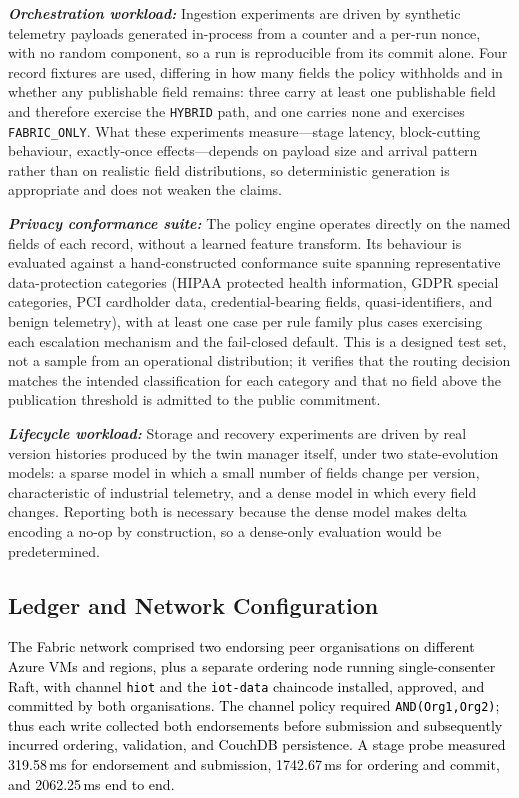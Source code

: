 \documentclass[final,5p,times,twocolumn]{elsarticle}
\begin{document}
\emph{\textbf{Orchestration workload:}} Ingestion experiments are driven by synthetic telemetry payloads generated in-process from a counter and a per-run nonce, with no random component, so a run is reproducible from its commit alone. Four record fixtures are used, differing in how many fields the policy withholds and in whether any publishable field remains: three carry at least one publishable field and therefore exercise the \texttt{HYBRID} path, and one carries none and exercises \texttt{FABRIC\_ONLY}. What these experiments measure---stage latency, block-cutting behaviour, exactly-once effects---depends on payload size and arrival pattern rather than on realistic field distributions, so deterministic generation is appropriate and does not weaken the claims.

\emph{\textbf{Privacy conformance suite:}} The policy engine operates directly on the named fields of each record, without a learned feature transform. Its behaviour is evaluated against a hand-constructed conformance suite spanning representative data-protection categories (HIPAA protected health information, GDPR special categories, PCI cardholder data, credential-bearing fields, quasi-identifiers, and benign telemetry), with at least one case per rule family plus cases exercising each escalation mechanism and the fail-closed default. This is a designed test set, not a sample from an operational distribution; it verifies that the routing decision matches the intended classification for each category and that no field above the publication threshold is admitted to the public commitment.

\emph{\textbf{Lifecycle workload:}} Storage and recovery experiments are driven by real version histories produced by the twin manager itself, under two state-evolution models: a sparse model in which a small number of fields change per version, characteristic of industrial telemetry, and a dense model in which every field changes. Reporting both is necessary because the dense model makes delta encoding a no-op by construction, so a dense-only evaluation would be predetermined.

\subsection{\textbf{Ledger and Network Configuration}}
\label{sec:ledger_config}
\textcolor{black}{The Fabric network comprised two endorsing peer organisations on different Azure VMs and regions, plus a separate ordering node running single-consenter Raft, with channel \texttt{hiot} and the \texttt{iot-data} chaincode installed, approved, and committed by both organisations. The channel policy required \texttt{AND(Org1,Org2)}; thus each write collected both endorsements before submission and subsequently incurred ordering, validation, and CouchDB persistence. A stage probe measured 319.58\,ms for endorsement and submission, 1742.67\,ms for ordering and commit, and 2062.25\,ms end to end.}
\end{document}
